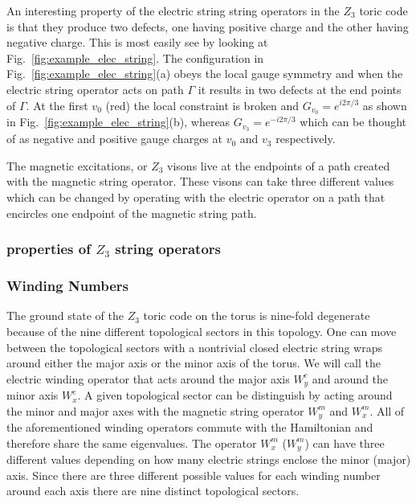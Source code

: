 \documentclass[twocolumn,prb,aps,floatfix,superscriptaddress]{revtex4-1}
\begin{document}
            An interesting property of the electric string string operators in the $Z_3$ toric code is
            that they produce two defects, one having positive charge and the other having negative
            charge. This is most easily see by looking at Fig.~\ref{fig:example_elec_string}. The
            configuration in Fig.~\ref{fig:example_elec_string}(a) obeys the local gauge symmetry and
            when the electric string operator acts on path $\Gamma$ it results in two defects at the
            end points of $\Gamma$. At the first $v_0$ (red) the local constraint is broken and
            $G_{v_0} = e^{i2\pi /3}$ as shown in Fig.~\ref{fig:example_elec_string}(b), whereas
            $G_{v_3} = e^{-i2\pi /3}$ which can be thought of as negative and positive gauge charges
            at $v_0$ and $v_3$ respectively.

            The magnetic excitations, or $Z_3$ visons live at the endpoints of a path created with the magnetic
            string operator. These visons can take three different values which can be changed by
            operating with the electric operator on a path that encircles one endpoint of the
            magnetic string path. 


        \subsubsection{properties of $Z_3$ string operators}

        \subsubsection{Winding Numbers}

            The ground state of the $Z_3$ toric code on the torus is nine-fold degenerate because of
            the nine different topological sectors in this topology. One can move between the
            topological sectors with a nontrivial closed electric string wraps around either
            the major axis or the minor axis of the torus. We will call the electric winding
            operator that acts around the major axis $W^e_y$ and around the minor axis $W^e_x$.
            A given topological sector can be distinguish 
            by acting around the minor and major axes with the magnetic string operator $W^m_y$ and
            $W^m_x$. All of the aforementioned winding operators commute with the Hamiltonian and
            therefore share the same eigenvalues. The operator $W^m_{x}$ ($W^m_{y}$) can 
            have three different values depending on how many electric strings enclose the minor
            (major) axis. Since there are three different
            possible values for each winding number around each axis there are nine distinct
            topological sectors.
\end{document}
